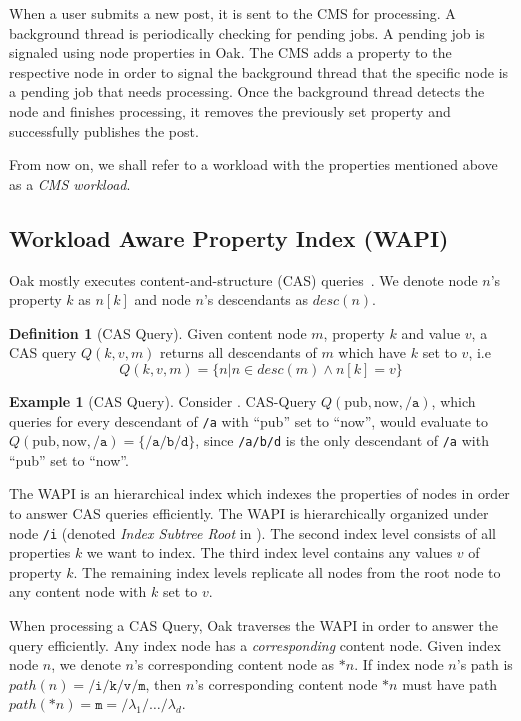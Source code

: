 \message{ !name(thesis.tex)}\documentclass[abstracton,12pt]{scrartcl}
\theoremstyle{definition}
\newtheorem{definition}{Definition}
\newtheorem{example}{Example}
\begin{document}
When a user submits a new post, it is sent to the CMS for processing. A
background thread is periodically checking for pending jobs. A pending job is
signaled using node properties in Oak.
The CMS adds a property to the respective node  in
order to signal the background thread that the specific node is a pending job that needs
processing. Once the
background thread detects the node and finishes processing, it removes the
previously set property and
successfully publishes the post.

From now on, we shall refer to a workload with the properties mentioned above as
a \textit{CMS workload}.

\subsection{Workload Aware Property Index (WAPI)}
\label{sec:wapi}

Oak mostly executes content-and-structure (CAS) queries~\cite{CM15}.
We denote node $n$'s property $k$ as $n[k]$ and node $n$'s descendants as
$desc(n)$.

\begin{definition}[CAS Query]
  Given content node $m$, property $k$ and value $v$, a CAS query
  $Q(k,v,m)$ returns all descendants of $m$ which have $k$ set to $v$, i.e
  $$ Q(k,v,m) = \{ n | n \in desc(m) \land n[k] = v\} $$
\end{definition}

\begin{example}[CAS Query]
  Consider . CAS-Query $Q(\text{pub},\text{now},\texttt{/a})$,
  which queries for every descendant of \texttt{/a} with
  ``pub'' set to ``now'', would evaluate to $Q(\text{pub},\text{now},\texttt{/a}) = \{\texttt{/a/b/d}\}$,
  since \texttt{/a/b/d} is the only descendant of \texttt{/a} with ``pub'' set
  to ``now''.
  \label{ex:cas_query}
\end{example}

The WAPI is an hierarchical index which indexes the properties of nodes in order
to answer CAS queries efficiently.
The WAPI is hierarchically organized under node \texttt{/i} (denoted
\textit{Index Subtree Root} in ).
The second index level consists of all properties $k$ we want
to index. The third index level contains any values $v$ of property $k$.
The remaining index levels replicate all nodes from the root node to any
content node with $k$ set to $v$.

When processing a CAS Query, Oak traverses the WAPI in order to answer the query
efficiently. Any index node has a \textit{corresponding} content node.
Given index node $n$, we denote $n$'s corresponding content node as $*n$.
If index node $n$'s path is $path(n) = \texttt{/i/k/v/m}$, then $n$'s corresponding content
node $*n$ must have path $path(*n) = \texttt{m} = \texttt{/}\lambda_1\texttt{/}\dots\texttt{/}\lambda_d$.
\end{document}
